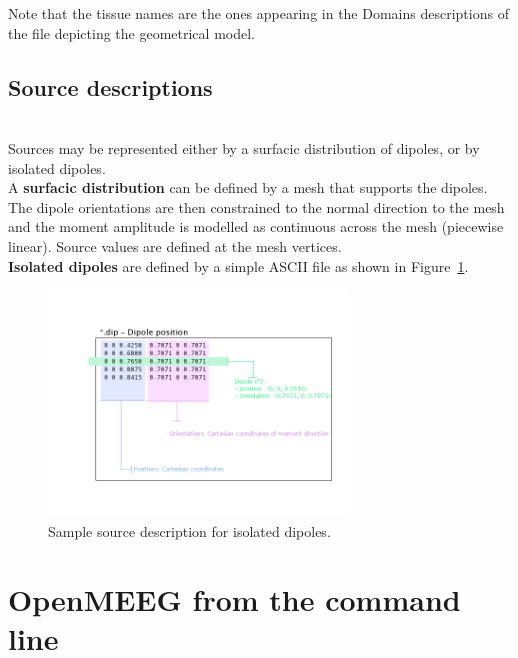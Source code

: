 \documentclass[10pt,journal]{book}
\begin{document}
    \medskip

    \noindent
    Note that the tissue names are the ones appearing in the Domains descriptions of the file depicting the geometrical model.

    \section{Source descriptions}\mbox{ }\\
    Sources may be represented either by a surfacic distribution of dipoles, or by isolated dipoles.\\
    A {\bf surfacic distribution} can be defined by a mesh that supports the dipoles. The dipole orientations are then constrained to the normal direction to the mesh and the moment amplitude is modelled as continuous across the mesh (piecewise linear). Source values are defined at the mesh vertices.\\
    {\bf Isolated dipoles} are defined by a simple ASCII file as shown in Figure~\ref{fig:dip}.\\

    \begin{figure}
        \includegraphics[width=8cm]{dipolePositions_en.png}
        \caption{Sample source description for isolated dipoles.}
        \label{fig:dip}
    \end{figure}

\chapter{OpenMEEG from the command line} %
\label{sub:command_line_tools}
\end{document}
